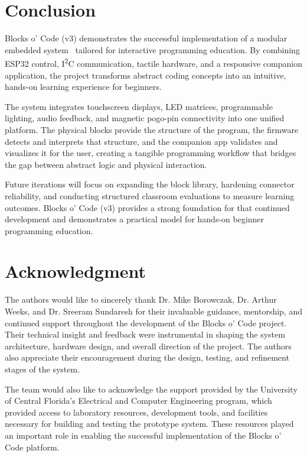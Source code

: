 \documentclass[10pt, conference]{IEEEtran}
\begin{document}
\section{Conclusion}

Blocks o' Code (v3) demonstrates the successful implementation of a modular embedded system~\cite{embedded} tailored for interactive programming education. By combining ESP32 control, I\textsuperscript{2}C communication, tactile hardware, and a responsive companion application, the project transforms abstract coding concepts into an intuitive, hands-on learning experience for beginners.

The system integrates touchscreen displays, LED matrices, programmable lighting, audio feedback, and magnetic pogo-pin connectivity into one unified platform. The physical blocks provide the structure of the program, the firmware detects and interprets that structure, and the companion app validates and visualizes it for the user, creating a tangible programming workflow that bridges the gap between abstract logic and physical interaction.

Future iterations will focus on expanding the block library, hardening connector reliability, and conducting structured classroom evaluations to measure learning outcomes. Blocks o' Code (v3) provides a strong foundation for that continued development and demonstrates a practical model for hands-on beginner programming education.

\section*{Acknowledgment}
The authors would like to sincerely thank Dr. Mike Borowczak, Dr. Arthur Weeks, and Dr. Sreeram Sundaresh for their invaluable guidance, mentorship, and continued support throughout the development of the Blocks o’ Code project. Their technical insight and feedback were instrumental in shaping the system architecture, hardware design, and overall direction of the project. The authors also appreciate their encouragement during the design, testing, and refinement stages of the system.

The team would also like to acknowledge the support provided by the University of Central Florida’s Electrical and Computer Engineering program, which provided access to laboratory resources, development tools, and facilities necessary for building and testing the prototype system. These resources played an important role in enabling the successful implementation of the Blocks o’ Code platform.
\end{document}
